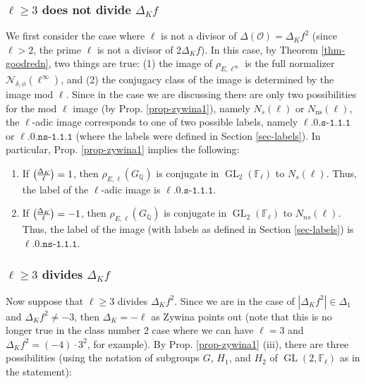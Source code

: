 \documentclass[11pt]{amsart}
\theoremstyle{definition}
\newenvironment{romanenum}{\hfill \begin{enumerate} \renewcommand{\theenumi}{\roman{enumi}}}{\end{enumerate}}
\newcommand{\QQ}{\mathbb Q}
\newcommand{\F}{\mathbb F}
\newcommand{\FF}{\mathbb F}
\newcommand\legendre[2]{{#1\overwithdelims () #2}}
\newcommand{\GL}{\operatorname{GL}}
\begin{document}
 \subsubsection{$\ell\geq 3$ does not divide $\Delta_K f$}\label{sec-ellnotdividedisc} We first consider the case where $\ell$  is not a  divisor of $\Delta(\mathcal{O})=\Delta_K f^2$ (since $\ell>2$, the prime $\ell$ is not a divisor of $2\Delta_K f$). In this case, by Theorem \ref{thm-goodredn}, two things are true: (1) the image of $\rho_{E,\ell^\infty}$ is  the full normalizer $\mathcal{N}_{\delta,\phi}(\ell^\infty)$, and (2) the conjugacy class of the image is determined by the image mod $\ell$. Since in the case we are discussing there are only two possibilities for the  mod $\ell$ image (by Prop. \ref{prop-zywina1}), namely $N_s(\ell)$ or $N_{\text{ns}}(\ell)$, the $\ell$-adic image corresponds to one of two possible labels, namely $\ell\texttt{.}0\texttt{.s-1.1.1}$ or $\ell\texttt{.}0\texttt{.ns-1.1.1}$ (where the labels were defined in Section \ref{sec-labels}). In particular, Prop. \ref{prop-zywina1} implies the following:
\begin{romanenum}
\item 
If $\legendre{\Delta_K}{\ell}=1$, then $\rho_{E,\ell}(G_\QQ)$ is conjugate in $\GL_2(\FF_\ell)$ to $N_s(\ell)$. Thus, the label of the $\ell$-adic image  is $\ell\texttt{.}0\texttt{.s-1.1.1}$.
\item 
If $\legendre{\Delta_K}{\ell}=-1$, then $\rho_{E,\ell}(G_\QQ)$ is conjugate in $\GL_2(\FF_\ell)$ to $N_{ns}(\ell)$. Thus, the label of the image (with labels as defined in Section \ref{sec-labels}) is $\ell\texttt{.}0\texttt{.ns-1.1.1}$.
\end{romanenum}

 \subsubsection{$\ell\geq 3$ divides $\Delta_K f$}\label{sec-elldividesdisc} Now suppose that $\ell\geq 3$ divides $\Delta_K f^2$. Since we are in the case of $|\Delta_K f^2|\in \Delta_1$ and $\Delta_K f^2\neq -3$, then $\Delta_K=-\ell$ as Zywina points out (note that this is no longer true in the class number $2$ case where we can have $\ell=3$ and $\Delta_K f^2=(-4)\cdot 3^2$, for example). By Prop. \ref{prop-zywina1} (iii), there are three possibilities (using the notation of subgroups $G$, $H_1$, and $H_2$ of  $\GL(2,\F_\ell)$ as in  the statement): 
\end{document}
